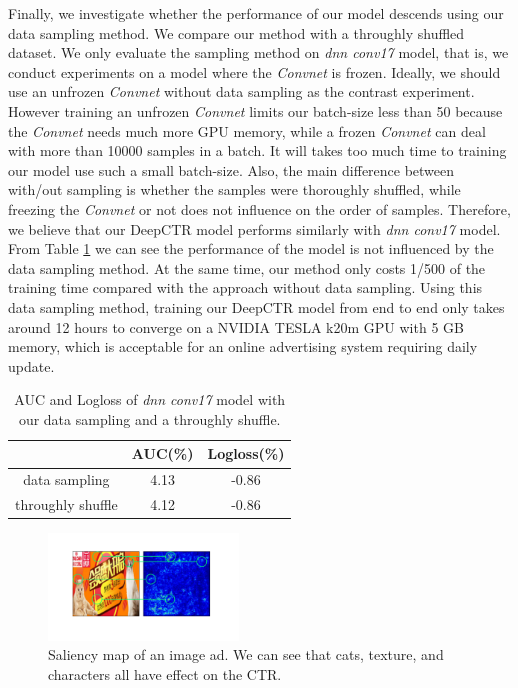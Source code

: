 \documentclass{sig-alternate}
\begin{document}
Finally, we investigate whether the performance of our model descends using our data sampling method. We compare our method with a throughly shuffled dataset. We only evaluate the sampling method on  \emph{dnn conv17} model, that is, we conduct experiments on a model where the \emph{Convnet} is frozen. Ideally, we should use an unfrozen \emph{Convnet} without data sampling as the contrast experiment. However training an unfrozen \emph{Convnet} limits our batch-size less than 50  because the \emph{Convnet} needs much more GPU memory, while a frozen \emph{Convnet} can deal with more than 10000 samples in a batch. It will takes too much time to training our model use such a small batch-size. Also, the main difference between with/out sampling is whether the samples were thoroughly shuffled, while freezing the \emph{Convnet} or not does not influence on the order of samples. Therefore, we believe that our  DeepCTR model performs similarly with \emph{dnn conv17} model. From Table \ref{table:datasampling} we can see the performance of the model is not influenced by the data sampling method. At the same time, our method only costs 1/500 of the training time compared with the approach without data sampling. Using this data sampling method, training our DeepCTR model from end to end only takes around 12 hours to converge on a NVIDIA TESLA k20m GPU with 5 GB memory, which is acceptable for an online advertising system requiring daily update. 
\begin{table}
	\centering
	\caption{AUC and Logloss of \emph{dnn conv17} model with our data sampling and a throughly shuffle.}
	\label{table:datasampling}
	\begin{tabular}{|c|c|c|} \hline
		& AUC(\%) & Logloss(\%)\\ \hline
		data sampling & 4.13 & -0.86\\ \hline
		throughly shuffle & 4.12 & -0.86\\ \hline
	\end{tabular}
\end{table}

\begin{figure}
	\centering
	\includegraphics[width=0.45\textwidth]{vis_compare}
	\caption{Saliency map of an image ad. We can see that cats, texture, and characters all have effect on the CTR. }
	\label{fig:vis_compare}
\end{figure}
\end{document}
